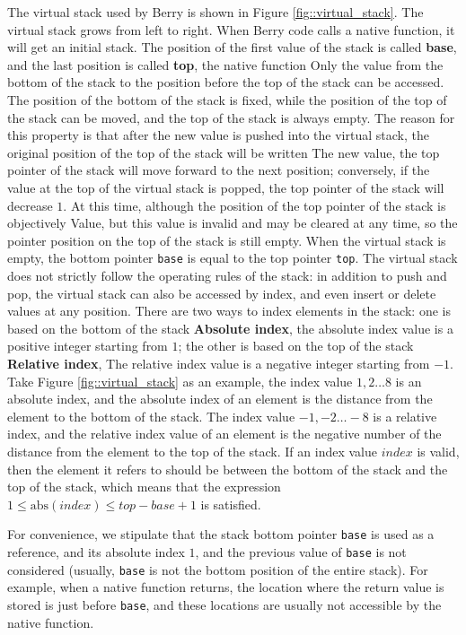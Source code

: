 The virtual stack used by Berry is shown in Figure \ref{fig::virtual_stack}. The virtual stack grows from left to right. When Berry code calls a native function, it will get an initial stack. The position of the first value of the stack is called \textbf{base}, and the last position is called \textbf{top}, the native function Only the value from the bottom of the stack to the position before the top of the stack can be accessed. The position of the bottom of the stack is fixed, while the position of the top of the stack can be moved, and the top of the stack is always empty. The reason for this property is that after the new value is pushed into the virtual stack, the original position of the top of the stack will be written The new value, the top pointer of the stack will move forward to the next position; conversely, if the value at the top of the virtual stack is popped, the top pointer of the stack will decrease $1$. At this time, although the position of the top pointer of the stack is objectively Value, but this value is invalid and may be cleared at any time, so the pointer position on the top of the stack is still empty. When the virtual stack is empty, the bottom pointer \texttt{base} is equal to the top pointer \texttt{top}. The virtual stack does not strictly follow the operating rules of the stack: in addition to push and pop, the virtual stack can also be accessed by index, and even insert or delete values   at any position. There are two ways to index elements in the stack: one is based on the bottom of the stack \textbf{Absolute index}, the absolute index value is a positive integer starting from $1$; the other is based on the top of the stack \textbf{Relative index}, The relative index value is a negative integer starting from $-1$. Take Figure \ref{fig::virtual_stack} as an example, the index value $1,2\ldots 8$ is an absolute index, and the absolute index of an element is the distance from the element to the bottom of the stack. The index value $-1,-2\ldots -8$ is a relative index, and the relative index value of an element is the negative number of the distance from the element to the top of the stack. If an index value $index$ is valid, then the element it refers to should be between the bottom of the stack and the top of the stack, which means that the expression $1\leqslant \mathrm{abs}(index)\leqslant top-base+1$ is satisfied.

For convenience, we stipulate that the stack bottom pointer \texttt{base} is used as a reference, and its absolute index $1$, and the previous value of \texttt{base} is not considered (usually, \texttt{base} is not the bottom position of the entire stack). For example, when a native function returns, the location where the return value is stored is just before \texttt{base}, and these locations are usually not accessible by the native function.


